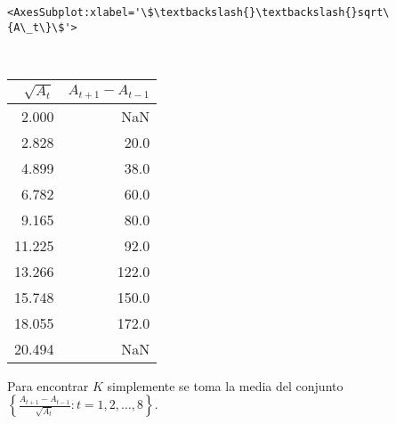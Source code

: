 \documentclass[11pt]{article}
\makeatletter
\newcommand{\boxspacing}{\kern\kvtcb@left@rule\kern\kvtcb@boxsep}
\newcommand{\prompt}[4]{
        {\ttfamily\llap{{\color{#2}[#3]:\hspace{3pt}#4}}\vspace{-\baselineskip}}
    }
\makeatother
\begin{document}
            \begin{tcolorbox}[breakable, size=fbox, boxrule=.5pt, pad at break*=1mm, opacityfill=0]
\prompt{Out}{outcolor}{54}{\boxspacing}
\begin{Verbatim}[commandchars=\\\{\}]
<AxesSubplot:xlabel='\$\textbackslash{}\textbackslash{}sqrt\{A\_t\}\$'>
\end{Verbatim}
\end{tcolorbox}
        
    \begin{center}
    \end{center}
    { \hspace*{\fill} \\}
    
    \begin{tabular}{rr}
\toprule
 $\sqrt{A_t}$ &  $A_{t+1}-A_{t-1}$ \\
\midrule
        2.000 &                NaN \\
        2.828 &               20.0 \\
        4.899 &               38.0 \\
        6.782 &               60.0 \\
        9.165 &               80.0 \\
       11.225 &               92.0 \\
       13.266 &              122.0 \\
       15.748 &              150.0 \\
       18.055 &              172.0 \\
       20.494 &                NaN \\
\bottomrule
\end{tabular}

    Para encontrar \(K\) simplemente se toma la media del conjunto
\(\left\{\frac{A_{t+1}-A_{t-1}}{\sqrt{A_t}}:t=1,2,\ldots,8\right\}\).
\end{document}
